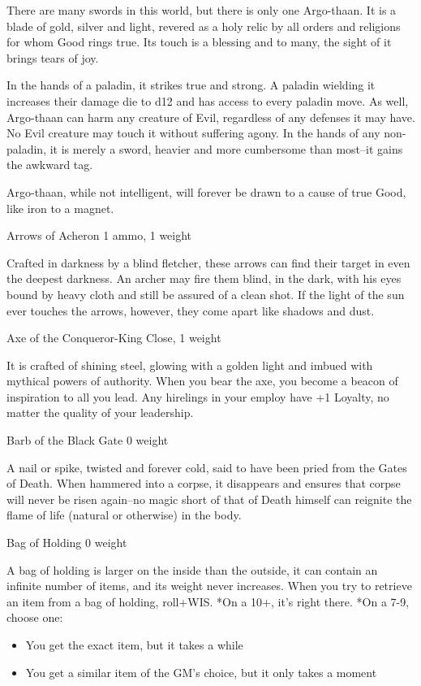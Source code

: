 There are many swords in this world, but there is only one Argo-thaan. It is a blade of gold, silver and light, revered as a holy relic by all orders and religions for whom Good rings true. Its touch is a blessing and to many, the sight of it brings tears of joy.


 In the hands of a paladin, it strikes true and strong. A paladin wielding it increases their damage die to d12 and has access to every paladin move. As well, Argo-thaan can harm any creature of Evil, regardless of any defenses it may have. No Evil creature may touch it without suffering agony. In the hands of any non-paladin, it is merely a sword, heavier and more cumbersome than most--it gains the awkward tag.


 Argo-thaan, while not intelligent, will forever be drawn to a cause of true Good, like iron to a magnet.


 Arrows of Acheron 1 ammo, 1 weight


 Crafted in darkness by a blind fletcher, these arrows can find their target in even the deepest darkness. An archer may fire them blind, in the dark, with his eyes bound by heavy cloth and still be assured of a clean shot. If the light of the sun ever touches the arrows, however, they come apart like shadows and dust.


 Axe of the Conqueror-King Close, 1 weight


 It is crafted of shining steel, glowing with a golden light and imbued with mythical powers of authority. When you bear the axe, you become a beacon of inspiration to all you lead. Any hirelings in your employ have +1 Loyalty, no matter the quality of your leadership.


 Barb of the Black Gate 0 weight


 A nail or spike, twisted and forever cold, said to have been pried from the Gates of Death. When hammered into a corpse, it disappears and ensures that corpse will never be risen again--no magic short of that of Death himself can reignite the flame of life (natural or otherwise) in the body.


 Bag of Holding 0 weight


 A bag of holding is larger on the inside than the outside, it can contain an infinite number of items, and its weight never increases. When you try to retrieve an item from a bag of holding, roll+WIS. *On a 10+, it's right there. *On a 7-9, choose one:
\begin{itemize}
\item You get the exact item, but it takes a while
\item You get a similar item of the GM's choice, but it only takes a moment

\end{itemize}


